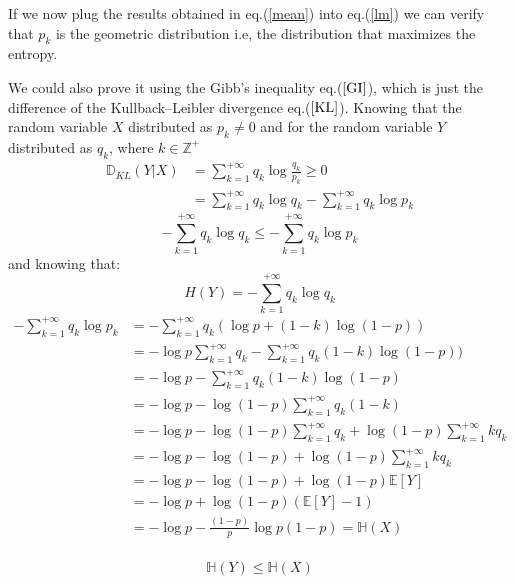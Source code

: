 \documentclass[11pt]{article}
\makeatletter
\newenvironment{proofw}{\par
	\pushQED{\qed}%
	\normalfont \topsep6\p@\@plus6\p@\relax
	\trivlist
	\item[]\ignorespaces
}{%
	\popQED\endtrivlist\@endpefalse
}
\makeatother
\begin{document}
\begin{proofw}
If we now plug the results obtained in eq.(\ref{mean}) into eq.(\ref{lm}) we can verify that $p_{k}$ is the geometric distribution i.e, the distribution that maximizes the entropy. 

We could also prove it using the Gibb's inequality eq.($\ref{GI}$),  which is just the difference of the Kullback–Leibler divergence eq.($\ref{KL}$). Knowing that the random variable $X$ distributed as $p_{k} \neq 0$ and for the random variable $Y$ distributed as $q_{k}$, where $k \in \mathbb Z^{+}$ 
\begin{equation}\label{KL}
\begin{split}
\mathbb{D}_{KL}(Y|X) &= \sum_{k=1}^{+\infty}q_{k}\log \frac{q_{k}}{p_{k}} \geq 0\\
&= \sum_{k=1}^{+\infty}q_{k}\log q_{k} - \sum_{k=1}^{+\infty}q_{k}\log p_{k}
\end{split}
\end{equation}
\begin{equation}\label{GI}
- \sum_{k=1}^{+\infty}q_{k}\log q_{k} \leq - \sum_{k=1}^{+\infty}q_{k}\log p_{k}
\end{equation}
and knowing that:
\begin{equation*}
H(Y) = - \sum_{k=1}^{+\infty}q_{k}\log q_{k}
\end{equation*}
\begin{equation*}
\begin{split}
- \sum_{k=1}^{+\infty}q_{k}\log p_{k} &= - \sum_{k=1}^{+\infty}q_{k}(\log p + (1-k) \log (1-p))\\
&= - \log p\sum_{k=1}^{+\infty}q_{k} -\sum_{k=1}^{+\infty} q_{k}(1-k) \log (1-p))\\
&= - \log p -\sum_{k=1}^{+\infty} q_{k}(1-k) \log (1-p)\\
&= - \log p -\log (1-p) \sum_{k=1}^{+\infty} q_{k}(1-k)\\
&= - \log p -\log (1-p) \sum_{k=1}^{+\infty} q_{k} + \log (1-p) \sum_{k=1}^{+\infty} k q_{k}\\
&= - \log p -\log (1-p) + \log (1-p) \sum_{k=1}^{+\infty} k q_{k}\\
&= - \log p -\log (1-p) + \log (1-p) \mathbb{E}[Y] \\
&= - \log p +\log (1-p) (\mathbb{E}[Y]-1) \\
&= -\log p -\frac{(1-p)}{p} \log p(1-p) = \mathbb{H}(X)\\
\end{split}
\end{equation*}

\begin{equation*}
\mathbb{H}(Y) \leq \mathbb{H}(X)  
\end{equation*}


\end{proofw}
\end{document}
